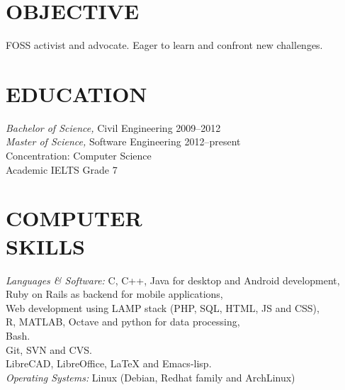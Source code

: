 \documentclass[margin, 10pt]{res} %
\begin{document}
\begin{resume}


\section{OBJECTIVE}
FOSS activist and advocate. Eager to learn and confront new challenges.

\section{EDUCATION}

{\sl Bachelor of Science,} Civil Engineering 2009--2012 \\
{\sl Master of Science,} Software Engineering 2012--present\\
Concentration: Computer Science \\
Academic IELTS Grade 7

\section{COMPUTER \\ SKILLS}

{\sl Languages \& Software:}
C, C++, Java for desktop and Android development, \\
Ruby on Rails as backend for mobile applications, \\
Web development using LAMP stack (PHP, SQL, HTML, JS and CSS), \\
R, MATLAB, Octave and python for data processing, \\
Bash. \\
Git, SVN and CVS.\\
LibreCAD, LibreOffice, LaTeX and Emacs-lisp. \\
{\sl Operating Systems:} Linux (Debian, Redhat family and ArchLinux)
 
 

\end{resume}
\end{document}
